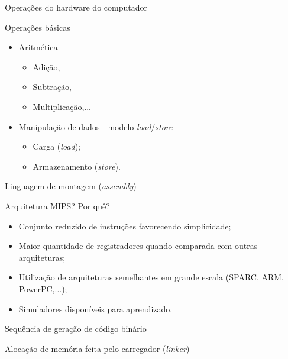 \def\sectiontitle{Operações do hardware do computador}

\begin{frame}{\sectiontitle}
  
\begin{block}{Operações básicas}
  \begin{itemize}
  \item Aritmética
    \begin{itemize}
    \item Adição,
    \item Subtração,
    \item Multiplicação,...
    \end{itemize}
  \item Manipulação de dados - modelo {\em load$\slash$store}
    \begin{itemize}
    \item Carga ({\em load});
    \item Armazenamento ({\em store}). 
    \end{itemize}
  \end{itemize}
\end{block}
\end{frame}

\begin{frame}{Linguagem de montagem ({\em assembly})}
  
  \begin{block}{Arquitetura MIPS? Por quê?}
    \begin{itemize}
    \item Conjunto reduzido de instruções favorecendo simplicidade;
    \item Maior quantidade de registradores quando comparada com
      outras arquiteturas;
    \item Utilização de arquiteturas semelhantes em grande escala
      (SPARC, ARM, PowerPC,...);
    \item Simuladores disponíveis para aprendizado.
    \end{itemize}
  \end{block}
\end{frame}

\begin{frame}{Sequência de geração de código binário}
  


\end{frame}

\begin{frame}{Alocação de memória feita pelo carregador ({\em linker})}
  
\begin{center}

\end{center}

\end{frame}



